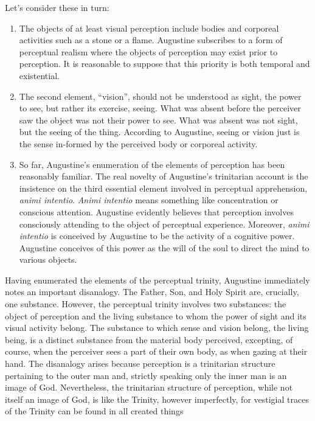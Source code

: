 \documentclass[12pt]{article}
\begin{document}
Let's consider these in turn:
\begin{enumerate}[(1)]
	\item The objects of at least visual perception include bodies and corporeal activities such as a stone or a flame. Augustine subscribes to a form of perceptual realism where the objects of perception may exist prior to perception. It is reasonable to suppose that this priority is both temporal and existential.
	\item The second element, ``vision'', should not be understood as sight, the power to see, but rather its exercise, seeing. What was absent before the perceiver saw the object was not their power to see. What was absent was not sight, but the seeing of the thing. According to Augustine, seeing or vision just is the sense in-formed by the perceived body or corporeal activity.
	\item So far, Augustine's enumeration of the elements of perception has been reasonably familiar. The real novelty of Augustine's trinitarian account is the insistence on the third essential element involved in perceptual apprehension, \emph{animi intentio}. \emph{Animi intentio} means something like concentration or conscious attention. Augustine evidently believes that perception involves consciously attending to the object of perceptual experience. Moreover, \emph{animi intentio} is conceived by Augustine to be the activity of a cognitive power. Augustine conceives of this power as the will of the soul to direct the mind to various objects.
\end{enumerate}

Having enumerated the elements of the perceptual trinity, Augustine immediately notes an important disanalogy. The Father, Son, and Holy Spirit are, crucially, one substance. However, the perceptual trinity involves two substances: the object of perception and the living substance to whom the power of sight and its visual activity belong. The substance to which sense and vision belong, the living being, is a distinct substance from the material body perceived, excepting, of course, when the perceiver sees a part of their own body, as when gazing at their hand. The disanalogy arises because perception is a trinitarian structure pertaining to the outer man and, strictly speaking only the inner man is an image of God. Nevertheless, the trinitarian structure of perception, while not itself an image of God, is like the Trinity, however imperfectly, for vestigial traces of the Trinity can be found in all created things
\end{document}
